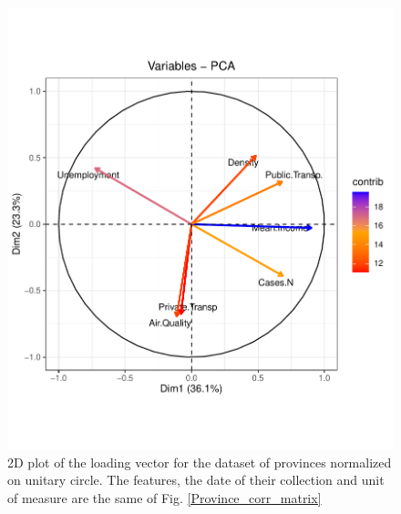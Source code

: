\documentclass[
12pt, %
a4paper, %
oneside, %
headinclude,footinclude, %
BCOR5mm, %
]{scrartcl}
\begin{document}
\begin{figure}[h]
\begin{center}
\includegraphics[scale=1]{Pic/Province_FULL_Variables-PCA.pdf}
\caption{2D plot of the loading vector for the dataset of provinces normalized on unitary circle. The features, the date of their collection and unit of measure are the same of Fig. \ref{Province_corr_matrix}}
\end{center}
\end{figure}
\end{document}
